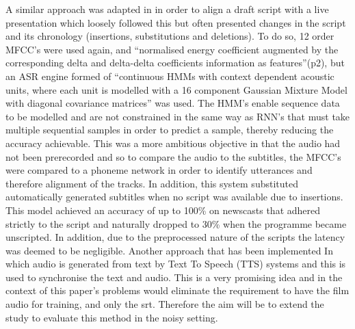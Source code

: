 A similar approach was adapted in \cite{Ortega2009} in order to align a draft script with a live presentation which loosely followed this but often presented changes in the script and its chronology (insertions, substitutions and deletions). To do so, 12 order MFCC’s were used again, and “normalised energy coefficient augmented by the corresponding delta and delta-delta coefficients information as features”(p2), but an ASR engine formed of “continuous HMMs with context dependent acoustic units, where each unit is modelled with a 16 component Gaussian Mixture Model with diagonal covariance matrices” was used. The HMM’s enable sequence data to be modelled and are not constrained in the same way as RNN’s that must take multiple sequential samples in order to predict a sample, thereby reducing the accuracy achievable. This was a more ambitious objective in that the audio had not been prerecorded and so to compare the audio to the subtitles, the MFCC’s were compared to a phoneme network in order to identify utterances and therefore alignment of the tracks. In addition, this system substituted automatically generated subtitles when no script was available due to insertions.
This model achieved an accuracy of up to 100\% on newscasts that adhered strictly to the script and naturally dropped to 30\% when the programme became unscripted. In addition, due to the preprocessed nature of the scripts the latency was deemed to be negligible. 
Another approach that has been implemented \cite{Campbell1996} In which audio is generated from text by Text To Speech (TTS) systems and this is used to synchronise the text and audio. This is a very promising idea and in the context of this paper’s problems would eliminate the requirement to have the film audio for training, and only the srt. Therefore the aim will be to extend the study to evaluate this method in the noisy setting.